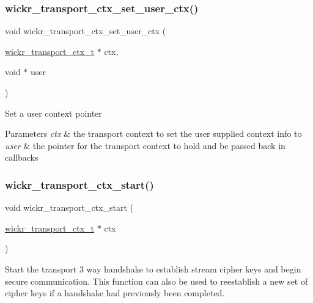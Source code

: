 \subsubsection{\texorpdfstring{wickr\+\_\+transport\+\_\+ctx\+\_\+set\+\_\+user\+\_\+ctx()}{wickr\_transport\_ctx\_set\_user\_ctx()}}
{\footnotesize\ttfamily void wickr\+\_\+transport\+\_\+ctx\+\_\+set\+\_\+user\+\_\+ctx (\begin{DoxyParamCaption}\item[{\hyperlink{structwickr__transport__ctx}{wickr\+\_\+transport\+\_\+ctx\+\_\+t} $\ast$}]{ctx,  }\item[{void $\ast$}]{user }\end{DoxyParamCaption})}

Set a user context pointer


\begin{DoxyParams}{Parameters}
{\em ctx} & the transport context to set the user supplied context info to \\
\hline
{\em user} & the pointer for the transport context to hold and be passed back in callbacks \\
\hline
\end{DoxyParams}
\mbox{\label{group__wickr__transport__ctx_gaee74761e31d5f0a6fc97e2ccf5ac1e29}} 
\subsubsection{\texorpdfstring{wickr\+\_\+transport\+\_\+ctx\+\_\+start()}{wickr\_transport\_ctx\_start()}}
{\footnotesize\ttfamily void wickr\+\_\+transport\+\_\+ctx\+\_\+start (\begin{DoxyParamCaption}\item[{\hyperlink{structwickr__transport__ctx}{wickr\+\_\+transport\+\_\+ctx\+\_\+t} $\ast$}]{ctx }\end{DoxyParamCaption})}

Start the transport 3 way handshake to establish stream cipher keys and begin secure communication. This function can also be used to reestablish a new set of cipher keys if a handshake had previously been completed.

